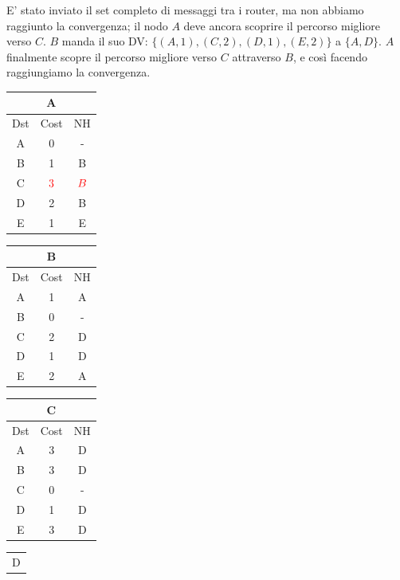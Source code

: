 \documentclass[10pt]{article}
\begin{document}
			\newline \newline
			E' stato inviato il set completo di messaggi tra i router, ma non abbiamo raggiunto la convergenza; il nodo $A$ deve ancora scoprire il percorso migliore verso $C$.
			\newline \newline
			$B$ manda il suo DV: $\{(A,1),(C,2),(D,1),(E,2)\}$ a $\{A,D\}$.
			\newline
			$A$ finalmente scopre il percorso migliore verso $C$ attraverso $B$, e così facendo raggiungiamo la convergenza.
			\begin{table}[h!]
				\begin{tabular}{|c||c||c|}
					\hline
					\multicolumn{3}{|c|}{A} \\
					\hline
					Dst & Cost & NH\\
					\hline
					A & 0 & - \\
					B & 1 & B \\
					C & $\color{red} 3$ & $\color{red} B$ \\
					D & 2 & B \\
					E & 1 & E \\
					\hline
				\end{tabular}
				\begin{tabular}{|c||c||c|}
					\hline
					\multicolumn{3}{|c|}{B} \\
					\hline
					Dst & Cost & NH\\
					\hline
					A & 1 & A \\
					B & 0 & - \\
					C & 2 & D \\
					D & 1 & D \\
					E & 2 & A \\
					\hline
				\end{tabular}
				\begin{tabular}{|c||c||c|}
					\hline
					\multicolumn{3}{|c|}{C} \\
					\hline
					Dst & Cost & NH\\
					\hline
					A & 3 & D \\
					B &3 & D \\
					C & 0 & - \\
					D & 1 & D \\
					E & 3 & D \\
					\hline
				\end{tabular}
				\begin{tabular}{|c||c||c|}
					\hline
					\multicolumn{3}{|c|}{D} \\

\end{tabular}
\end{table}
\end{document}
